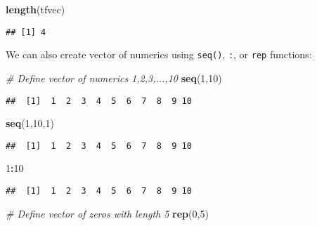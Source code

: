 \documentclass[
]{article}
\newenvironment{Shaded}{\begin{snugshade}}{\end{snugshade}}
\newcommand{\CommentTok}[1]{\textcolor[rgb]{0.56,0.35,0.01}{\textit{#1}}}
\newcommand{\DecValTok}[1]{\textcolor[rgb]{0.00,0.00,0.81}{#1}}
\newcommand{\FunctionTok}[1]{\textcolor[rgb]{0.13,0.29,0.53}{\textbf{#1}}}
\newcommand{\NormalTok}[1]{#1}
\newcommand{\SpecialCharTok}[1]{\textcolor[rgb]{0.81,0.36,0.00}{\textbf{#1}}}
\begin{document}
\begin{Shaded}
\begin{Highlighting}[]
\FunctionTok{length}\NormalTok{(tfvec)}
\end{Highlighting}
\end{Shaded}

\begin{verbatim}
## [1] 4
\end{verbatim}

We can also create vector of numerics using \texttt{seq()}, \texttt{:},
or \texttt{rep} functions:

\begin{Shaded}
\begin{Highlighting}[]
\CommentTok{\# Define vector of numerics 1,2,3,...,10}
\FunctionTok{seq}\NormalTok{(}\DecValTok{1}\NormalTok{,}\DecValTok{10}\NormalTok{)}
\end{Highlighting}
\end{Shaded}

\begin{verbatim}
##  [1]  1  2  3  4  5  6  7  8  9 10
\end{verbatim}

\begin{Shaded}
\begin{Highlighting}[]
\FunctionTok{seq}\NormalTok{(}\DecValTok{1}\NormalTok{,}\DecValTok{10}\NormalTok{,}\DecValTok{1}\NormalTok{)}
\end{Highlighting}
\end{Shaded}

\begin{verbatim}
##  [1]  1  2  3  4  5  6  7  8  9 10
\end{verbatim}

\begin{Shaded}
\begin{Highlighting}[]
\DecValTok{1}\SpecialCharTok{:}\DecValTok{10}
\end{Highlighting}
\end{Shaded}

\begin{verbatim}
##  [1]  1  2  3  4  5  6  7  8  9 10
\end{verbatim}

\begin{Shaded}
\begin{Highlighting}[]
\CommentTok{\# Define vector of zeros with length 5}
\FunctionTok{rep}\NormalTok{(}\DecValTok{0}\NormalTok{,}\DecValTok{5}\NormalTok{)}
\end{Highlighting}
\end{Shaded}
\end{document}
